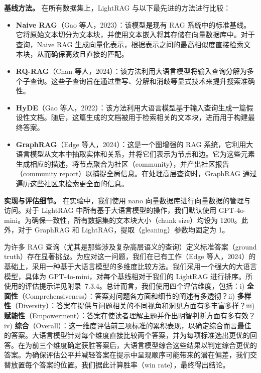 \documentclass[11pt,UTF8,fontset=fandol]{ctexart}
\begin{document}
\textbf{基线方法。} 在所有数据集上，LightRAG 与以下最先进的方法进行比较：
\begin{itemize}[leftmargin=1.5em]
\item \textbf{Naive RAG}（Gao 等人，2023）：该模型是现有 RAG 系统中的标准基线。它将原始文本切分为文本块，并使用文本嵌入将其存储在向量数据库中。对于查询，Naive RAG 生成向量化表示，根据表示之间的最高相似度直接检索文本块，从而确保高效且直接的匹配。
\item \textbf{RQ-RAG}（Chan 等人，2024）：该方法利用大语言模型将输入查询分解为多个子查询。这些子查询旨在通过重写、分解和消歧等显式技术来提升搜索准确性。
\item \textbf{HyDE}（Gao 等人，2022）：该方法利用大语言模型基于输入查询生成一篇假设性文档。随后，这篇生成的文档被用于检索相关的文本块，进而用于构建最终答案。
\item \textbf{GraphRAG}（Edge 等人，2024）：这是一个图增强的 RAG 系统，它利用大语言模型从文本中抽取实体和关系，并将它们表示为节点和边。它为这些元素生成相应的描述，将节点聚合为社区（community），并产出社区报告（community report）以捕捉全局信息。在处理高层查询时，GraphRAG 通过遍历这些社区来检索更全面的信息。
\end{itemize}

\textbf{实现与评估细节。} 在实验中，我们使用 nano 向量数据库进行向量数据的管理与访问。对于 LightRAG 中所有基于大语言模型的操作，我们默认使用 GPT-4o-mini。为确保一致性，所有数据集的文本块大小（chunk size）均设为 1200。此外，对于 GraphRAG 和 LightRAG，提取（gleaning）参数均固定为 1。

为许多 RAG 查询（尤其是那些涉及复杂高层语义的查询）定义标准答案（ground truth）存在显著挑战。为应对这一问题，我们在已有工作（Edge 等人，2024）的基础上，采用一种基于大语言模型的多维度比较方法。我们采用一个强大的大语言模型，具体为 GPT-4o-mini，对每个基线相对于我们的 LightRAG 进行排序。所使用的评估提示详见附录~7.3.4。总计而言，我们使用四个评估维度，包括：i) \textbf{全面性}（Comprehensiveness）：答案对问题各方面和细节的阐述有多透彻？ii) \textbf{多样性}（Diversity）：答案在提供与问题相关的不同视角和洞见方面有多丰富多样？iii) \textbf{赋能性}（Empowerment）：答案在使读者理解主题并作出明智判断方面有多有效？iv) \textbf{综合}（Overall）：这一维度评估前三项标准的累积表现，以确定综合而言最佳的答案。大语言模型针对每个维度直接比较两个答案，并为每项标准选出更优的回答。在为前三个维度确定获胜答案后，大语言模型综合这些结果以判定综合更优的答案。为确保评估公平并减轻答案在提示中呈现顺序可能带来的潜在偏差，我们交替放置每个答案的位置。我们据此计算胜率（win rate），最终得出结论。
\end{document}
